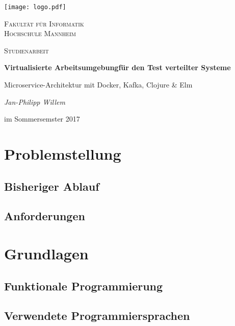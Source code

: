 \documentclass[10pt,a4paper]{report}
\begin{document}
  \begin{titlepage}
    {\texttt{[image: logo.pdf]}}\par
    \vspace{4cm}
    \centering
    {\scshape\LARGE Fakultät für Informatik \\ Hochschule Mannheim\par}
    \vspace{1cm}
    {\scshape\Large Studienarbeit\par}
    \vspace{.5cm}
    {\huge\bfseries Virtualisierte Arbeitsumgebung\break für den Test verteilter Systeme\par}

    {\LARGE Microservice-Architektur mit Docker, Kafka, Clojure \& Elm\par}
    \vspace{1cm}
    {\Large\itshape Jan-Philipp Willem\par}
    \vspace{.5cm}
    {\Large im Sommersemster 2017}
    \vfill
  \end{titlepage}

  \begin{abstract}
    \blindtext
  \end{abstract}

  \tableofcontents
  \clearpage

  \chapter{Problemstellung}
  \section{Bisheriger Ablauf}
  \section{Anforderungen}

  \chapter{Grundlagen}
  \section{Funktionale Programmierung}
  \section{Verwendete Programmiersprachen}
\end{document}
